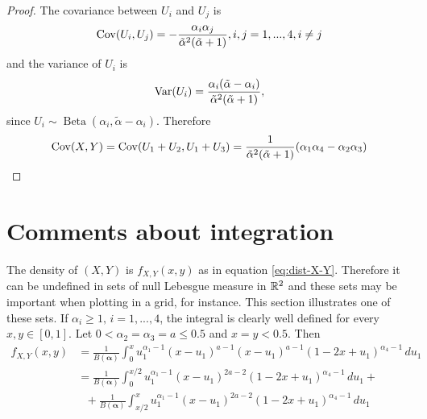 \begin{proof}

  The covariance between $U_i$ and $U_j$ is \cite[p. 11]{lin2016dirichlet} 
\begin{equation}
  \operatorname{Cov}(U_i, U_j) = - \frac{\alpha_i\alpha_j}{\tilde{\alpha}^2(\tilde{\alpha}+1)}, i,j = 1,...,4, i \neq j
\end{equation} 
and the variance of $U_i$ is 
\begin{equation}
  \operatorname{Var}(U_i) = \frac{\alpha_i(\tilde{\alpha}-\alpha_i)}{\tilde{\alpha}^2(\tilde{\alpha}+1)},
\end{equation}
since $U_i \sim \operatorname{Beta}(\alpha_i, \tilde{\alpha} -\alpha_i)$.
Therefore 
\begin{equation}
  \operatorname{Cov}(X,Y) = \operatorname{Cov}(U_1+U_2, U_1+U_3) = \frac{1}{\tilde{\alpha}^2(\tilde{\alpha}+1)}(\alpha_1\alpha_4 - \alpha_2\alpha_3)
\end{equation}
  
\end{proof}

\section{Comments about integration}

The density of $(X,Y)$ is $f_{X,Y}(x,y)$ as in equation \eqref{eq:dist-X-Y}. Therefore it can be undefined in sets of null Lebesgue measure in $\mathbb{R}^2$ and these sets may be important when plotting in a grid, for instance. This section illustrates one of these sets. If $\alpha_i \ge 1,
\, i = 1,...,4$, the integral is clearly well defined for every $x,y \in [0,1]$. Let $0 < \alpha_2 = \alpha_3 = a \le 0.5$ and $x = y < 0.5$. Then
\begin{equation*}
  \begin{split}
    f_{X,Y}(x,y) &= \frac{1}{B(\boldsymbol{\alpha})}\int_{0}^x u_1^{\alpha_1-1}(x-u_1)^{a-1}(x-u_1)^{a-1}(1-2x+u_1)^{\alpha_4-1} \, du_1 \\
    &= \frac{1}{B(\boldsymbol{\alpha})}\int_{0}^{x/2} u_1^{\alpha_1-1}(x-u_1)^{2a-2}(1-2x+u_1)^{\alpha_4-1} \, du_1 + \\
    &~~~+ \frac{1}{B(\boldsymbol{\alpha})}\int_{x/2}^x u_1^{\alpha_1-1}(x-u_1)^{2a-2}(1-2x+u_1)^{\alpha_4-1} \, du_1
  \end{split}
\end{equation*}

